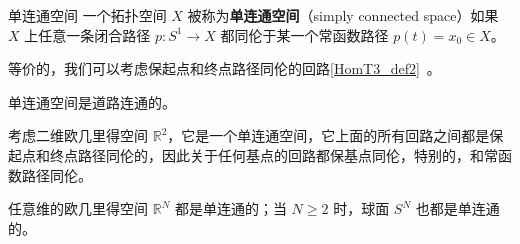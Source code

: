 

\begin{definition}{单连通空间}\label{SmpCn_def1}
一个拓扑空间 $X$ 被称为\textbf{单连通空间}（simply connected space）如果 $X$ 上任意一条闭合路径 $p: S^1 \to X$ 都同伦于某一个常函数路径 $p(t) = x_0 \in X$。
\end{definition}

等价的，我们可以考虑保起点和终点路径同伦的回路\autoref{HomT3_def2}~。

\begin{theorem}{}
单连通空间是道路连通的。
\end{theorem}

\begin{example}{}
考虑二维欧几里得空间 $\mathbb{R}^2$，它是一个单连通空间，它上面的所有回路之间都是保起点和终点路径同伦的，因此关于任何基点的回路都保基点同伦，特别的，和常函数路径同伦。

任意维的欧几里得空间 $\mathbb{R}^N$ 都是单连通的；当 $N \geq 2$ 时，球面 $S^N$ 也都是单连通的。
\end{example}